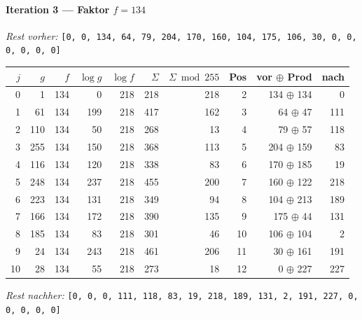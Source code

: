 \paragraph{Iteration 3 — Faktor $f = 134$}
\textit{Rest vorher:} \texttt{[0, 0, 134, 64, 79, 204, 170, 160, 104, 175, 106, 30, 0, 0, 0, 0, 0, 0]}\par
\begin{center}
\footnotesize
\setlength{\tabcolsep}{4pt}
\renewcommand{\arraystretch}{1.1}
\begin{tabular}{r|rr|rrrr|rrr}
\toprule
$j$ & $g$ & $f$ & $\log g$ & $\log f$ & $\Sigma$ & $\Sigma\bmod 255$ & Pos & vor $\oplus$ Prod & nach \\
\midrule
0 & 1 & 134 & 0 & 218 & 218 & 218 & 2 & 134 $\oplus$ 134 & 0 \\
1 & 61 & 134 & 199 & 218 & 417 & 162 & 3 & 64 $\oplus$ 47 & 111 \\
2 & 110 & 134 & 50 & 218 & 268 & 13 & 4 & 79 $\oplus$ 57 & 118 \\
3 & 255 & 134 & 150 & 218 & 368 & 113 & 5 & 204 $\oplus$ 159 & 83 \\
4 & 116 & 134 & 120 & 218 & 338 & 83 & 6 & 170 $\oplus$ 185 & 19 \\
5 & 248 & 134 & 237 & 218 & 455 & 200 & 7 & 160 $\oplus$ 122 & 218 \\
6 & 223 & 134 & 131 & 218 & 349 & 94 & 8 & 104 $\oplus$ 213 & 189 \\
7 & 166 & 134 & 172 & 218 & 390 & 135 & 9 & 175 $\oplus$ 44 & 131 \\
8 & 185 & 134 & 83 & 218 & 301 & 46 & 10 & 106 $\oplus$ 104 & 2 \\
9 & 24 & 134 & 243 & 218 & 461 & 206 & 11 & 30 $\oplus$ 161 & 191 \\
10 & 28 & 134 & 55 & 218 & 273 & 18 & 12 & 0 $\oplus$ 227 & 227 \\
\bottomrule
\end{tabular}
\end{center}
\textit{Rest nachher:} \texttt{[0, 0, 0, 111, 118, 83, 19, 218, 189, 131, 2, 191, 227, 0, 0, 0, 0, 0]}\par\medskip
